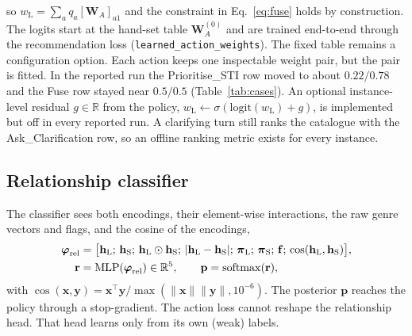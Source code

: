 so $w_{\mathrm{L}}=\sum_{a}q_a[\mathbf{W}_{\!A}]_{a1}$ and the constraint in Eq.~\eqref{eq:fuse} holds by construction. The logits start at the hand-set table $\mathbf{W}_{\!A}^{(0)}$ and are trained end-to-end through the recommendation loss (\texttt{learned\_action\_weights}). The fixed table remains a configuration option. Each action keeps one inspectable weight pair, but the pair is fitted. In the reported run the Prioritise\_STI row moved to about $0.22/0.78$ and the Fuse row stayed near $0.5/0.5$ (Table~\ref{tab:cases}). An optional instance-level residual $g\in\mathbb{R}$ from the policy, $w_{\mathrm{L}}\leftarrow\sigma(\mathrm{logit}(w_{\mathrm{L}})+g)$, is implemented but off in every reported run. A clarifying turn still ranks the catalogue with the Ask\_Clarification row, so an offline ranking metric exists for every instance.

\subsection{Relationship classifier}
\label{sec:rel}
The classifier sees both encodings, their element-wise interactions, the raw genre vectors and flags, and the cosine of the encodings,
\begin{align}
  \boldsymbol{\varphi}_{\mathrm{rel}} &= \big[\mathbf{h}_{\mathrm{L}};\,\mathbf{h}_{\mathrm{S}};\,\mathbf{h}_{\mathrm{L}}\odot\mathbf{h}_{\mathrm{S}};\,|\mathbf{h}_{\mathrm{L}}-\mathbf{h}_{\mathrm{S}}|;\,\boldsymbol{\pi}_{\mathrm{L}};\,\boldsymbol{\pi}_{\mathrm{S}};\,\mathbf{f};\,\cos(\mathbf{h}_{\mathrm{L}},\mathbf{h}_{\mathrm{S}})\big], \label{eq:relfeat}\\
  \mathbf{r} &= \mathrm{MLP}(\boldsymbol{\varphi}_{\mathrm{rel}})\in\mathbb{R}^{5},\qquad \mathbf{p}=\mathrm{softmax}(\mathbf{r}), \label{eq:relpost}
\end{align}
with $\cos(\mathbf{x},\mathbf{y})=\mathbf{x}^{\!\top}\mathbf{y}/\max(\lVert\mathbf{x}\rVert\lVert\mathbf{y}\rVert,10^{-6})$. The posterior $\mathbf{p}$ reaches the policy through a stop-gradient. The action loss cannot reshape the relationship head. That head learns only from its own (weak) labels.

